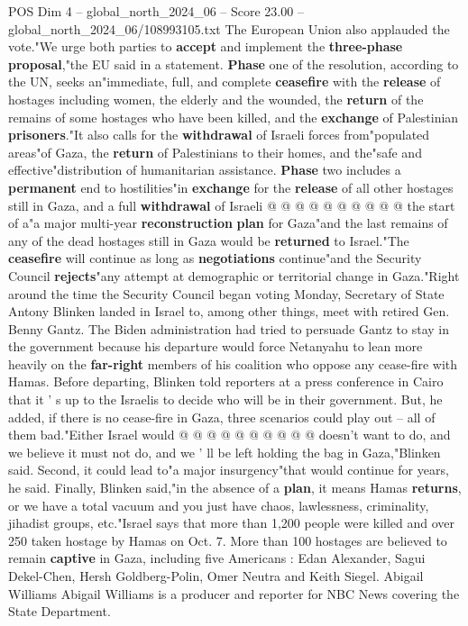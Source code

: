 \begin{textsample}{POS Dim 4 – global\_north\_2024\_06 – Score 23.00 – global\_north\_2024\_06/108993105.txt}
The European Union also applauded the vote."We urge both parties to \textbf{accept} and implement the \textbf{three-phase} \textbf{proposal},"the EU said in a statement. \textbf{Phase} one of the resolution, according to the UN, seeks an"immediate, full, and complete \textbf{ceasefire} with the \textbf{release} of hostages including women, the elderly and the wounded, the \textbf{return} of the remains of some hostages who have been killed, and the \textbf{exchange} of Palestinian \textbf{prisoners}."It also calls for the \textbf{withdrawal} of Israeli forces from"populated areas"of Gaza, the \textbf{return} of Palestinians to their homes, and the"safe and effective"distribution of humanitarian assistance. \textbf{Phase} two includes a \textbf{permanent} end to hostilities"in \textbf{exchange} for the \textbf{release} of all other hostages still in Gaza, and a full \textbf{withdrawal} of Israeli @ @ @ @ @ @ @ @ @ @ the start of a"a major multi-year \textbf{reconstruction} \textbf{plan} for Gaza"and the last remains of any of the dead hostages still in Gaza would be \textbf{returned} to Israel."The \textbf{ceasefire} will continue as long as \textbf{negotiations} continue"and the Security Council \textbf{rejects}"any attempt at demographic or territorial change in Gaza."Right around the time the Security Council began voting Monday, Secretary of State Antony Blinken landed in Israel to, among other things, meet with retired Gen.
Benny Gantz.
The Biden administration had tried to persuade Gantz to stay in the government because his departure would force Netanyahu to lean more heavily on the \textbf{far-right} members of his coalition who oppose any cease-fire with Hamas.
Before departing, Blinken told reporters at a press conference in Cairo that it ' s up to the Israelis to decide who will be in their government.
But, he added, if there is no cease-fire in Gaza, three scenarios could play out -- all of them bad."Either Israel would @ @ @ @ @ @ @ @ @ @ doesn't want to do, and we believe it must not do, and we ' ll be left holding the bag in Gaza,"Blinken said.
Second, it could lead to"a major insurgency"that would continue for years, he said.
Finally, Blinken said,"in the absence of a \textbf{plan}, it means Hamas \textbf{returns}, or we have a total vacuum and you just have chaos, lawlessness, criminality, jihadist groups, etc."Israel says that more than 1,200 people were killed and over 250 taken hostage by Hamas on Oct. 7.
More than 100 hostages are believed to remain \textbf{captive} in Gaza, including five Americans : Edan Alexander, Sagui Dekel-Chen, Hersh Goldberg-Polin, Omer Neutra and Keith Siegel.
Abigail Williams Abigail Williams is a producer and reporter for NBC News covering the State Department.

\end{textsample}
